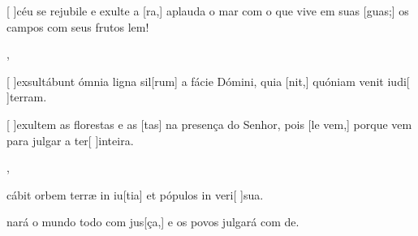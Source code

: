 {    {\item {}[ ]{céu} se rejubile e exulte a [ra,] aplauda o mar com o que vive em suas [guas;]  os campos com seus frutos lem!},
  {\item {}[ ]{ex}sultábunt ómnia ligna sil[rum] a fácie Dómini, quia [nit,] quóniam venit iudi[ ]{ter}ram.}%
    {\item {}[ ]{e}xultem as florestas e as [tas] na presença do Senhor, pois [le vem,] porque vem para julgar a ter[ ]{in}{tei}ra.},
  {\item {}cábit orbem terræ in iu[tia] et pópulos in veri[ ]{su}a.}%
    {\item {}nará o mundo todo com jus[ça,] e os povos julgará com de.}
}